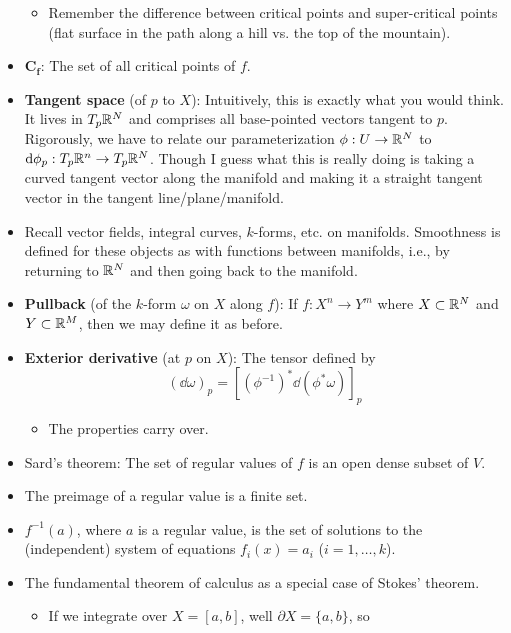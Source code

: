 \documentclass[../notes.tex]{subfiles}
\begin{document}
\begin{itemize}
    \begin{itemize}
        \item Remember the difference between critical points and super-critical points (flat surface in the path along a hill vs. the top of the mountain).
    \end{itemize}
    \item $\bm{C_f}$: The set of all critical points of $f$.
    \item \textbf{Tangent space} (of $p$ to $X$): Intuitively, this is exactly what you would think. It lives in $T_p\mathbb{R}^N$ and comprises all base-pointed vectors tangent to $p$. Rigorously, we have to relate our parameterization $\phi:U\to\mathbb{R}^N$ to $\dd\phi_p:T_p\mathbb{R}^n\to T_p\mathbb{R}^N$. Though I guess what this is really doing is taking a curved tangent vector along the manifold and making it a straight tangent vector in the tangent line/plane/manifold.
    \item Recall vector fields, integral curves, $k$-forms, etc. on manifolds. Smoothness is defined for these objects as with functions between manifolds, i.e., by returning to $\mathbb{R}^N$ and then going back to the manifold.
    \item \textbf{Pullback} (of the $k$-form $\omega$ on $X$ along $f$): If $f:X^n\to Y^m$ where $X\subset\mathbb{R}^N$ and $Y\subset\mathbb{R}^M$, then we may define it as before.
    \item \textbf{Exterior derivative} (at $p$ on $X$): The tensor defined by
    \begin{equation*}
        (\dd\omega)_p = [(\phi^{-1})^*\dd(\phi^*\omega)]_p
    \end{equation*}
    \begin{itemize}
        \item The properties carry over.
    \end{itemize}
    \item Sard's theorem: The set of regular values of $f$ is an open dense subset of $V$.
    \item The preimage of a regular value is a finite set.
    \item $f^{-1}(a)$, where $a$ is a regular value, is the set of solutions to the (independent) system of equations $f_i(x)=a_i$ ($i=1,\dots,k$).
    \item The fundamental theorem of calculus as a special case of Stokes' theorem.
    \begin{itemize}
        \item If we integrate over $X=[a,b]$, well $\partial X=\{a,b\}$, so
        \begin{equation*}

\end{equation*}
\end{itemize}
\end{itemize}
\end{document}
